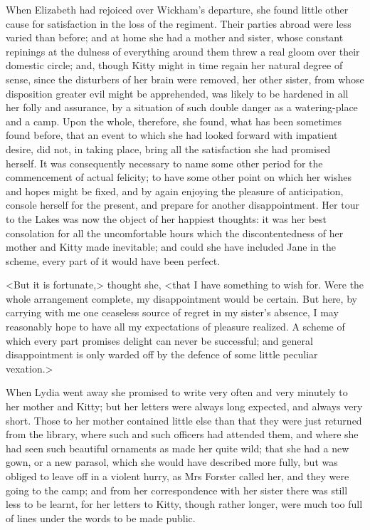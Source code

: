 When Elizabeth had rejoiced over Wickham's departure, she found little other cause for satisfaction in the loss of the regiment. Their parties abroad were less varied than before; and at home she had a mother and sister, whose constant repinings at the dulness of everything around them threw a real gloom over their domestic circle; and, though Kitty might in time regain her natural degree of sense, since the disturbers of her brain were removed, her other sister, from whose disposition greater evil might be apprehended, was likely to be hardened in all her folly and assurance, by a situation of such double danger as a watering-place and a camp. Upon the whole, therefore, she found, what has been sometimes found before, that an event to which she had looked forward with impatient desire, did not, in taking place, bring all the satisfaction she had promised herself. It was consequently necessary to name some other period for the commencement of actual felicity; to have some other point on which her wishes and hopes might be fixed, and by again enjoying the pleasure of anticipation, console herself for the present, and prepare for another disappointment. Her tour to the Lakes was now the object of her happiest thoughts: it was her best consolation for all the uncomfortable hours which the discontentedness of her mother and Kitty made inevitable; and could she have included Jane in the scheme, every part of it would have been perfect.

<But it is fortunate,> thought she, <that I have something to wish for. Were the whole arrangement complete, my disappointment would be certain. But here, by carrying with me one ceaseless source of regret in my sister's absence, I may reasonably hope to have all my expectations of pleasure realized. A scheme of which every part promises delight can never be successful; and general disappointment is only warded off by the defence of some little peculiar vexation.>

When Lydia went away she promised to write very often and very minutely to her mother and Kitty; but her letters were always long expected, and always very short. Those to her mother contained little else than that they were just returned from the library, where such and such officers had attended them, and where she had seen such beautiful ornaments as made her quite wild; that she had a new gown, or a new parasol, which she would have described more fully, but was obliged to leave off in a violent hurry, as Mrs Forster called her, and they were going to the camp; and from her correspondence with her sister there was still less to be learnt, for her letters to Kitty, though rather longer, were much too full of lines under the words to be made public.

